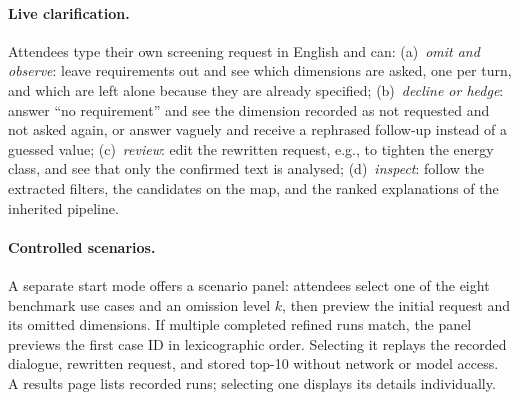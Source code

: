 \documentclass[sigconf,review]{acmart}
\begin{document}
\paragraph{Live clarification.} Attendees type their own screening
request in English and can:
(a)~\emph{omit and observe}: leave requirements out and see which
dimensions are asked, one per turn, and which are left alone because
they are already specified;
(b)~\emph{decline or hedge}: answer ``no requirement'' and see the
dimension recorded as not requested and not asked again, or answer
vaguely and receive a rephrased follow-up instead of a guessed value;
(c)~\emph{review}: edit the rewritten request, e.g., to tighten the
energy class, and see that only the confirmed text is analysed;
(d)~\emph{inspect}: follow the extracted filters, the candidates on the
map, and the ranked explanations of the inherited pipeline.

\paragraph{Controlled scenarios.} A separate start mode offers a
scenario panel: attendees select one of the eight benchmark use cases
and an omission level $k$, then preview the initial request and its
omitted dimensions. If multiple completed refined runs match, the panel
previews the first case ID in lexicographic order. Selecting it replays
the recorded dialogue, rewritten request, and stored top-10 without
network or model access. A results page lists recorded runs; selecting
one displays its details individually.
\end{document}
